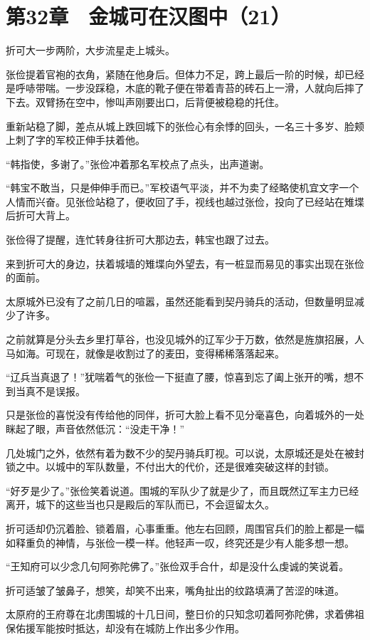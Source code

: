 \section{第32章　金城可在汉图中（21）}

折可大一步两阶，大步流星走上城头。

张俭提着官袍的衣角，紧随在他身后。但体力不足，跨上最后一阶的时候，却已经是呼哧带喘。一步没踩稳，木底的靴子便在带着青苔的砖石上一滑，人就向后摔了下去。双臂扬在空中，惨叫声刚要出口，后背便被稳稳的托住。

重新站稳了脚，差点从城上跌回城下的张俭心有余悸的回头，一名三十多岁、脸颊上刺了字的军校正伸手扶着他。

“韩指使，多谢了。”张俭冲着那名军校点了点头，出声道谢。

“韩宝不敢当，只是伸伸手而已。”军校语气平淡，并不为卖了经略使机宜文字一个人情而兴奋。见张俭站稳了，便收回了手，视线也越过张俭，投向了已经站在雉堞后折可大背上。

张俭得了提醒，连忙转身往折可大那边去，韩宝也跟了过去。

来到折可大的身边，扶着城墙的雉堞向外望去，有一桩显而易见的事实出现在张俭的面前。

太原城外已没有了之前几日的喧嚣，虽然还能看到契丹骑兵的活动，但数量明显减少了许多。

之前就算是分头去乡里打草谷，也没见城外的辽军少于万数，依然是旌旗招展，人马如海。可现在，就像是收割过了的麦田，变得稀稀落落起来。

“辽兵当真退了！”犹喘着气的张俭一下挺直了腰，惊喜到忘了阖上张开的嘴，想不到当真不是误报。

只是张俭的喜悦没有传给他的同伴，折可大脸上看不见分毫喜色，向着城外的一处眯起了眼，声音依然低沉：“没走干净！”

几处城门之外，依然有着为数不少的契丹骑兵盯视。可以说，太原城还是处在被封锁之中。以城中的军队数量，不付出大的代价，还是很难突破这样的封锁。

“好歹是少了。”张俭笑着说道。围城的军队少了就是少了，而且既然辽军主力已经离开，城下的这些当也只是殿后的军队而已，不会逗留太久。

折可适却仍沉着脸、锁着眉，心事重重。他左右回顾，周围官兵们的脸上都是一幅如释重负的神情，与张俭一模一样。他轻声一叹，终究还是少有人能多想一想。

“王知府可以少念几句阿弥陀佛了。”张俭双手合什，却是没什么虔诚的笑说着。

折可适皱了皱鼻子，想笑，却笑不出来，嘴角扯出的纹路填满了苦涩的味道。

太原府的王府尊在北虏围城的十几日间，整日价的只知念叨着阿弥陀佛，求着佛祖保佑援军能按时抵达，却没有在城防上作出多少作用。

